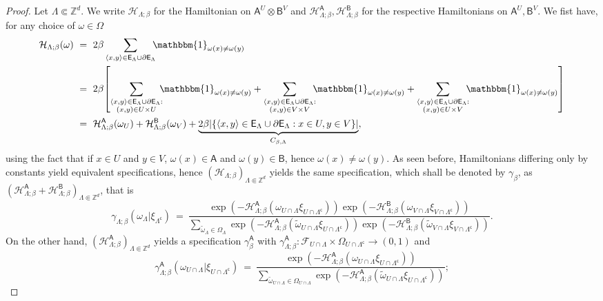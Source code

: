 \documentclass[12pt]{article}
\renewcommand{\AA}{\mathsf{A}}
\newcommand{\AB}{\mathsf{B}}
\newcommand{\E}{\mathsf{E}}
\newcommand{\F}{\mathcal{F}}
\renewcommand{\H}{\mathcal{H}}
\newcommand{\Z}{\mathbb{Z}}
\newcommand{\oglati}[1]{\left[#1\right]}
\newcommand{\ra}{\rightarrow}
\newcommand{\1}{\mathbbm{1}}
\renewcommand{\sp}[1]{\langle #1\rangle}
\renewcommand{\c}{\mathsf{c}}
\newcommand{\5}{\vspace{0.5cm}}
\renewcommand{\tilde}{\widetilde}
\theoremstyle{definition}
\begin{document}
\begin{proof}
Let $\Lambda\Subset\Z^d$. We write $\H_{\Lambda;\beta}$ for the Hamiltonian on $\AA^U\otimes\AB^V$ and $\H_{\Lambda;\beta}^\AA,\H_{\Lambda;\beta}^{\AB}$ for the respective Hamiltonians on $\AA^U,\AB^V$. We fist have, for any choice of $\omega\in\Omega$ 
\begin{align*}
\H_{\Lambda;\beta}(\omega) ~&=~ 2\beta\sum_{\sp{x,y}\in\E_\Lambda\cup\partial\E_\Lambda}\!\!\!\1_{\omega(x)\neq\omega(y)} \\
&=~ 2\beta\!\oglati{\sum_{\substack{\sp{x,y}\in\E_\Lambda\cup\partial\E_\Lambda:\\(x,y)\in U\times U}}\!\!\!\1_{\omega(x)\neq\omega(y)}+\sum_{\substack{\sp{x,y}\in\E_\Lambda\cup\partial\E_\Lambda:\\(x,y)\in V\times V}}\!\!\!\1_{\omega(x)\neq\omega(y)}+\sum_{\substack{\sp{x,y}\in\E_\Lambda\cup\partial\E_\Lambda:\\(x,y)\in U\times V}}\!\!\!\1_{\omega(x)\neq\omega(y)}} \\
&=~ \H_{\Lambda;\beta}^\AA(\omega_U) + \H_{\Lambda;\beta}^\AB(\omega_V) + \underbrace{2\beta|\{\sp{x,y}\in\E_\Lambda\cup\partial\E_\Lambda:x\in U,y\in V\}|}_{C_{\beta,\Lambda}},
\end{align*}
using the fact that if $x\in U$ and $y\in V$, $\omega(x)\in\AA$ and $\omega(y)\in\AB$, hence $\omega(x)\neq\omega(y)$. As seen before, Hamiltonians differing only by constants yield equivalent specifications, hence $(\H_{\Lambda;\beta})_{\Lambda\Subset\Z^d}$ yields the same specification, which shall be denoted by $\gamma_\beta$, as $(\H_{\Lambda;\beta}^\AA+\H_{\Lambda;\beta}^\AB)_{\Lambda\Subset\Z^d}$, that is
$$\gamma_{\Lambda;\beta}(\omega_\Lambda|\xi_{\Lambda^\c}) ~=~ \frac{\exp(-\H_{\Lambda;\beta}^\AA(\omega_{U\cap\Lambda}\xi_{U\cap\Lambda^\c}))\exp(-\H_{\Lambda;\beta}^\AB(\omega_{V\cap\Lambda}\xi_{V\cap\Lambda^\c}))}{\sum_{\tilde{\omega}_\Lambda\in\Omega_\Lambda}\exp(-\H_{\Lambda;\beta}^\AA(\tilde{\omega}_{U\cap\Lambda}\xi_{U\cap\Lambda^\c}))\exp(-\H_{\Lambda;\beta}^\AB(\tilde{\omega}_{V\cap\Lambda}\xi_{V\cap\Lambda^\c}))}.$$
On the other hand, $(\H_{\Lambda;\beta}^\AA)_{\Lambda\Subset\Z^d}$ yields a specification $\gamma_\beta^\AA$ with $\gamma_{\Lambda;\beta}^\AA:\F_{U\cap\Lambda}\times\Omega_{U\cap\Lambda^\c}\ra(0,1)$ and
$$\gamma_{\Lambda;\beta}^\AA(\omega_{U\cap\Lambda}|\xi_{U\cap\Lambda^\c}) ~=~ \frac{\exp(-\H_{\Lambda;\beta}^{\AA}(\omega_{U\cap\Lambda}\xi_{U\cap\Lambda^\c}))}{\sum_{\tilde{\omega}_{U\cap\Lambda}\in\Omega_{U\cap\Lambda}}\exp(-\H_{\Lambda;\beta}^{\AA}(\tilde{\omega}_{U\cap\Lambda}\xi_{U\cap\Lambda^\c}))};$$

\end{proof}
\end{document}
